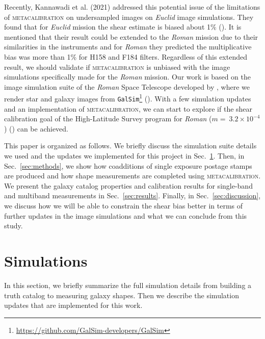 {Recently, Kannawadi et al. (2021) addressed this potential issue of the limitations of \textsc{metacalibration} on undersampled images on \emph{Euclid} image simulations. They found that for \emph{Euclid} mission the shear estimate is biased about 1$\%$ (\citealt{2021MNRAS.502.4048K}). It is mentioned that their result could be extended to the \emph{Roman} mission due to their similarities in the instruments and for \emph{Roman} they predicted the multiplicative bias was more than 1\% for H158 and F184 filters. Regardless of this extended result, we should validate if \textsc{metacalibration} is unbiased with the image simulations specifically made for the \emph{Roman} mission. Our work is based on the image simulation suite of the \emph{Roman} Space Telescope developed by \citet{2021MNRAS.501.2044T}, where we render star and galaxy images from \texttt{GalSim}\footnote{\url{ https://github.com/GalSim-developers/GalSim}} (\citealt{2015A&C....10..121R}). With a few simulation updates and an implementation of \textsc{metacalibration}, we can start to explore if the shear calibration goal of the High-Latitude Survey program for \emph{Roman} ($m=~3.2\times10^{-4}$) (\citealt{2018arXiv180403628D}) can be achieved. \par


This paper is organized as follows. We briefly discuss the simulation suite details we used and the updates we implemented for this project in Sec.~\ref{sec:sims}. Then, in Sec.~\ref{sec:methods}, we show how coadditions of single exposure postage stamps are produced and how shape measurements are completed using \textsc{metacalibration}. We present the galaxy catalog properties and calibration results for single-band and multiband measurements in Sec.~\ref{sec:results}. Finally, in Sec.~\ref{sec:discussion}, we discuss how we will be able to constrain the shear bias better in terms of further updates in the image simulations and what we can conclude from this study. 


\section{Simulations}
\label{sec:sims}
In this section, we briefly summarize the full simulation details from building a truth catalog to measuring galaxy shapes. Then we describe the simulation updates that are implemented for this work.
}
